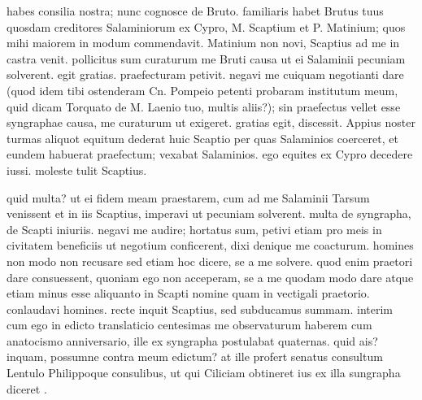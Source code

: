  habes consilia nostra; nunc cognosce de Bruto. familiaris habet Brutus tuus quosdam creditores Salaminiorum ex Cypro, M. Scaptium et P. Matinium; quos mihi maiorem in modum commendavit. Matinium non novi, Scaptius ad me in castra venit. pollicitus sum curaturum me Bruti causa ut ei Salaminii pecuniam solverent. egit gratias. praefecturam petivit. negavi me cuiquam negotianti dare (quod idem tibi ostenderam Cn. Pompeio petenti probaram institutum meum, quid dicam Torquato de M. Laenio tuo, multis aliis?); sin praefectus vellet esse syngraphae causa, me curaturum ut exigeret. gratias egit, discessit. Appius noster turmas aliquot equitum dederat huic Scaptio per quas Salaminios coerceret, et eundem habuerat praefectum; vexabat Salaminios. ego equites ex Cypro decedere iussi. moleste tulit Scaptius.

 quid multa? ut ei fidem meam praestarem, cum ad me Salaminii Tarsum venissent et in iis Scaptius, imperavi ut pecuniam solverent. multa de syngrapha, de Scapti iniuriis. negavi me audire; hortatus sum, petivi etiam pro meis in civitatem beneficiis ut negotium conficerent, dixi denique me coacturum. homines non modo non recusare sed etiam hoc dicere, se a me solvere. quod enim praetori dare consuessent, quoniam ego non acceperam, se a me quodam modo dare atque etiam minus esse aliquanto in Scapti nomine quam in vectigali praetorio. conlaudavi homines. recte inquit Scaptius, sed subducamus summam. interim cum ego in edicto translaticio centesimas me observaturum haberem cum anatocismo anniversario, ille ex syngrapha postulabat quaternas. quid ais? inquam, possumne contra meum edictum? at ille profert senatus consultum Lentulo Philippoque consulibus, ut qui Ciliciam obtineret ius ex illa sungrapha diceret .

